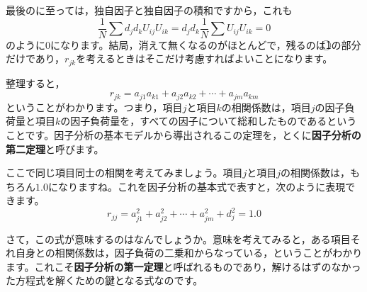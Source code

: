 \documentclass{ltjsbook}
\begin{document}
最後のに至っては，独自因子と独自因子の積和ですから，これも
\begin{equation}
	\frac{1}{N}\sum d_{j}d_{k}U_{ij}U_{ik}=d_{j}d_{k}\frac{1}{N}\sum U_{ij}U_{ik}=0
\end{equation}
のように$0$になります。結局，消えて無くなるのがほとんどで，残るのは\textcircled{1}の部分だけであり，$r_{jk}$を考えるときはそこだけ考慮すればよいことになります。

整理すると，
\begin{equation}
	r_{jk}=a_{j1}a_{k1}+a_{j2}a_{k2}+ \cdots +a_{jm}a_{km}
\end{equation}
ということがわかります。つまり，項目$j$と項目$k$の相関係数は，項目$j$の因子負荷量と項目$k$の因子負荷量を，すべての因子について総和したものであるということです。因子分析の基本モデルから導出されるこの定理を，とくに\textbf{因子分析の第二定理}と呼びます。

ここで同じ項目同士の相関を考えてみましょう。項目$j$と項目$j$の相関係数は，もちろん$1.0$になりますね。これを因子分析の基本式で表すと，次のように表現できます。
\begin{equation}
	\label{facteo1}
	r_{jj}=a_{j1}^2+a_{j2}^2+ \cdots + a_{jm}^2 + d_j^2 = 1.0
\end{equation}

さて，この式が意味するのはなんでしょうか。意味を考えてみると，ある項目それ自身との相関係数は，因子負荷の二乗和からなっている，ということがわかります。これこそ\textbf{因子分析の第一定理}と呼ばれるものであり，解けるはずのなかった方程式を解くための鍵となる式なのです。
\end{document}
